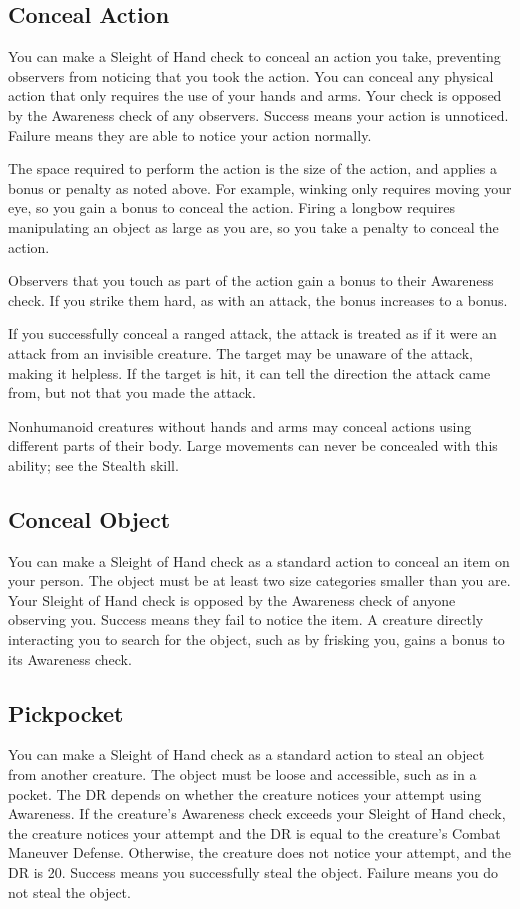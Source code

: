     \subsection{Conceal Action}
        You can make a Sleight of Hand check to conceal an action you take, preventing observers from noticing that you took the action. You can conceal any physical action that only requires the use of your hands and arms. Your check is opposed by the Awareness check of any observers. Success means your action is unnoticed. Failure means they are able to notice your action normally.

        The space required to perform the action is the size of the action, and applies a bonus or penalty as noted above. For example, winking only requires moving your eye, so you gain a  bonus to conceal the action. Firing a longbow requires manipulating an object as large as you are, so you take a  penalty to conceal the action.

        Observers that you touch as part of the action gain a  bonus to their Awareness check. If you strike them hard, as with an attack, the bonus increases to a  bonus.

        If you successfully conceal a ranged attack, the attack is treated as if it were an attack from an invisible creature. The target may be unaware of the attack, making it helpless. If the target is hit, it can tell the direction the attack came from, but not that you made the attack.

        Nonhumanoid creatures without hands and arms may conceal actions using different parts of their body. Large movements can never be concealed with this ability; see the Stealth skill.

    \subsection{Conceal Object}
        You can make a Sleight of Hand check as a standard action to conceal an item on your person. The object must be at least two size categories smaller than you are. Your Sleight of Hand check is opposed by the Awareness check of anyone observing you. Success means they fail to notice the item. A creature directly interacting you to search for the object, such as by frisking you, gains a  bonus to its Awareness check.

    \subsection{Pickpocket}
        You can make a Sleight of Hand check as a standard action to steal an object from another creature. The object must be loose and accessible, such as in a pocket. The DR depends on whether the creature notices your attempt using Awareness. If the creature's Awareness check exceeds your Sleight of Hand check, the creature notices your attempt and the DR is equal to the creature's Combat Maneuver Defense. Otherwise, the creature does not notice your attempt, and the DR is 20. Success means you successfully steal the object. Failure means you do not steal the object.

